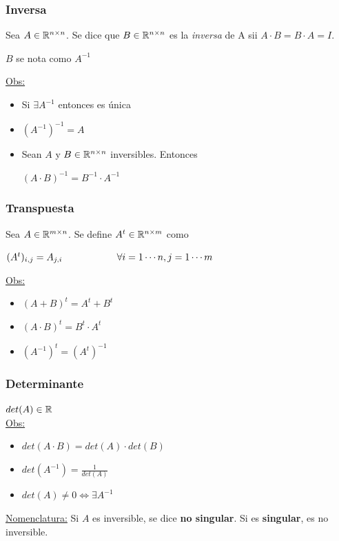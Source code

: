 \documentclass[]{article}
\begin{document}
\subsubsection{Inversa}
Sea $A\in\mathbb{R}^{n\times n}$. Se dice que $B\in\mathbb{R}^{n\times n}$ es la \emph{inversa} de A sii $A\cdot B = B\cdot A = I$.

$B$ se nota como $A^{-1}$

\underline{Obs:}
\begin{itemize}
	\item Si $\exists A^{-1}$ entonces es única
	\item $(A^{-1})^{-1} = A$
	\item Sean $A$ y $B \in \mathbb{R}^{n\times n}$ inversibles. Entonces
	\begin{center}
		$(A\cdot B)^{-1} = B^{-1} \cdot A^{-1}$
	\end{center}
\end{itemize}

\subsubsection{Transpuesta}
	Sea $A\in\mathbb{R}^{m\times n}$. Se define $A^t\in\mathbb{R}^{n\times m}$ como
	\begin{center}
		$(A^t)_{i,j} = A_{j,i} \hspace{2cm} \forall i=1\cdots n,j=1\cdots m$
	\end{center}

	\underline{Obs:}
	\begin{itemize}
		\item $(A+B)^t = A^t+B^t$
		\item $(A\cdot B)^t = B^t\cdot A^t$
		\item $(A^{-1})^t = (A^t)^{-1}$
	\end{itemize}

\subsubsection{Determinante} $det(A)\in\mathbb{R}$\\


	\underline{Obs:}
	\begin{itemize}
		\item $det(A\cdot B) = det(A) \cdot det(B)$
		\item $det(A^{-1}) = \displaystyle \frac{1}{det(A)}$
		\item $det(A)\neq 0 \Leftrightarrow \exists A^{-1}$
	\end{itemize}

	\underline{Nomenclatura:} Si $A$ es inversible, se dice \textbf{no singular}. Si es \textbf{singular}, es no inversible.
\end{document}

